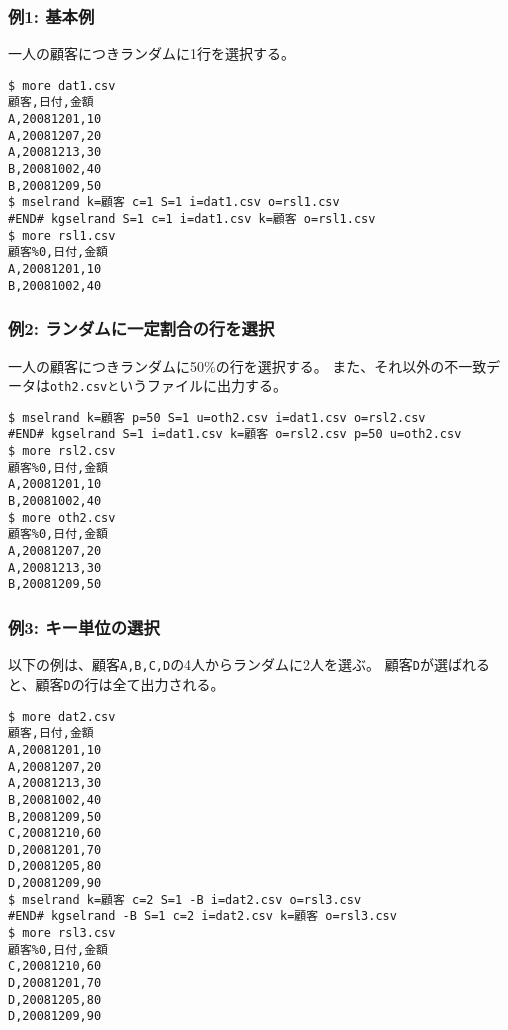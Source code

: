 \subsubsection*{例1: 基本例}

一人の顧客につきランダムに1行を選択する。


\begin{Verbatim}[baselinestretch=0.7,frame=single]
$ more dat1.csv
顧客,日付,金額
A,20081201,10
A,20081207,20
A,20081213,30
B,20081002,40
B,20081209,50
$ mselrand k=顧客 c=1 S=1 i=dat1.csv o=rsl1.csv
#END# kgselrand S=1 c=1 i=dat1.csv k=顧客 o=rsl1.csv
$ more rsl1.csv
顧客%0,日付,金額
A,20081201,10
B,20081002,40
\end{Verbatim}
\subsubsection*{例2: ランダムに一定割合の行を選択}

一人の顧客につきランダムに50\%の行を選択する。
また、それ以外の不一致データは\verb|oth2.csvと|いうファイルに出力する。


\begin{Verbatim}[baselinestretch=0.7,frame=single]
$ mselrand k=顧客 p=50 S=1 u=oth2.csv i=dat1.csv o=rsl2.csv
#END# kgselrand S=1 i=dat1.csv k=顧客 o=rsl2.csv p=50 u=oth2.csv
$ more rsl2.csv
顧客%0,日付,金額
A,20081201,10
B,20081002,40
$ more oth2.csv
顧客%0,日付,金額
A,20081207,20
A,20081213,30
B,20081209,50
\end{Verbatim}
\subsubsection*{例3: キー単位の選択}

以下の例は、顧客\verb|A,B,C,D|の4人からランダムに2人を選ぶ。
顧客\verb|D|が選ばれると、顧客\verb|D|の行は全て出力される。


\begin{Verbatim}[baselinestretch=0.7,frame=single]
$ more dat2.csv
顧客,日付,金額
A,20081201,10
A,20081207,20
A,20081213,30
B,20081002,40
B,20081209,50
C,20081210,60
D,20081201,70
D,20081205,80
D,20081209,90
$ mselrand k=顧客 c=2 S=1 -B i=dat2.csv o=rsl3.csv
#END# kgselrand -B S=1 c=2 i=dat2.csv k=顧客 o=rsl3.csv
$ more rsl3.csv
顧客%0,日付,金額
C,20081210,60
D,20081201,70
D,20081205,80
D,20081209,90
\end{Verbatim}
